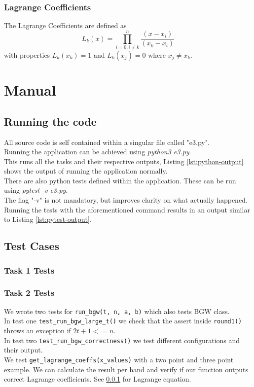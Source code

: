 \documentclass{article}
\begin{document}
            \subsubsection{Lagrange Coefficients}\label{lagrange}
                The Lagrange Coefficients are defined as 
                \begin{equation*}
                    L_k(x) = \prod_{i=0,i\not=k}^n \frac{(x-x_i)}{(x_k-x_i)}
                \end{equation*}
                with properties $L_k(x_k) = 1$ and $L_k(x_j) = 0$ where $x_j \not= x_k$.

    \newpage
	\section{Manual}
		\subsection{Running the code}
		All source code is self contained within a singular file called "e3.py".\\
		Running the application can be achieved using \textit{python3 e3.py}.\\
		This runs all the tasks and their respective outputs, Listing \ref{lst:python-output} shows the output of running the application normally.\\
		There are also python tests defined within the application. These can be run using \textit{pytest -v e3.py}.\\
		The flag "-v" is not mandatory, but improves clarity on what actually happened.\\
		Running the tests with the aforementioned command results in an output similar to Listing \ref{lst:pytest-output}.
		
		\subsection{Test Cases}
	
		\subsubsection{Task 1 Tests}
		
		\subsubsection{Task 2 Tests}
        We wrote two tests for \lstinline{run_bgw(t, n, a, b)} which also tests BGW class.\\
        In test one \lstinline{test_run_bgw_large_t()} we check that the assert inside \lstinline{round1()} throws an exception if $2t+1 <= n$.\\
        In test two \lstinline{test_run_bgw_correctness()} we test different configurations and their output.\\
        We test \lstinline{get_lagrange_coeffs(x_values)} with a two point and three point example. We can calculate the result per hand and verify if our function outputs correct Lagrange coefficients. See \ref{lagrange} for Lagrange equation.
		
\end{document}
